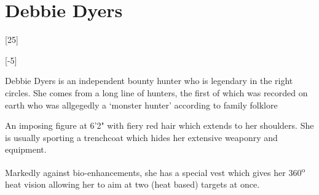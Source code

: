 \documentclass{memoir}
\begin{document}
\section{Debbie Dyers}
\label{sec:debbie-dyers}
 
\begin{character*}
     


  [25]

  [-5]

\end{character*}


Debbie Dyers is an independent bounty hunter who is legendary in the right
circles. She comes from a long line of hunters, the first of which was recorded
on earth who was allgegedly a `monster hunter' according to family folklore

An imposing figure at 6'2" with fiery red hair which extends to her shoulders.
She is usually sporting a trenchcoat which hides her extensive weaponry and
equipment.

Markedly against bio-enhancements, she has a special vest which gives her
360\textsuperscript{o} heat vision allowing her to aim at two (heat based)
targets at once.


\end{document}
